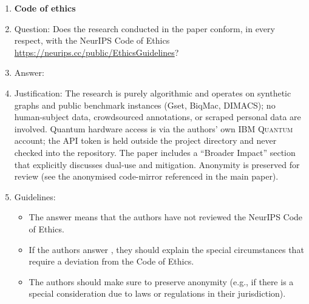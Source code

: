 \begin{enumerate}
\item {\bf Code of ethics}
    \item[] Question: Does the research conducted in the paper conform, in every respect, with the NeurIPS Code of Ethics \url{https://neurips.cc/public/EthicsGuidelines}?
    \item[] Answer: \answerYes{} %
    \item[] Justification: The research is purely algorithmic and
        operates on synthetic graphs and public benchmark instances
        (Gset, BiqMac, DIMACS); no human-subject data, crowdsourced
        annotations, or scraped personal data are involved. Quantum
        hardware access is via the authors' own \textsc{IBM Quantum}
        account; the API token is held outside the project directory and
        never checked into the repository. The paper includes a
        ``Broader Impact'' section that explicitly discusses dual-use
        and mitigation. Anonymity is preserved for review (see the
        anonymised code-mirror referenced in the main paper).
    \item[] Guidelines:
    \begin{itemize}
        \item The answer \answerNA{} means that the authors have not reviewed the NeurIPS Code of Ethics.
        \item If the authors answer \answerNo, they should explain the special circumstances that require a deviation from the Code of Ethics.
        \item The authors should make sure to preserve anonymity (e.g., if there is a special consideration due to laws or regulations in their jurisdiction).
    \end{itemize}



\end{enumerate}
